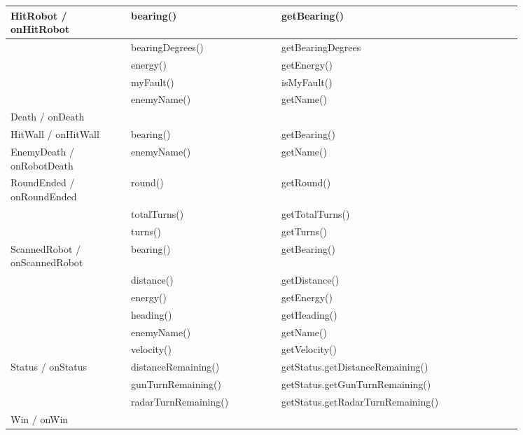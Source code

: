 \begin{center}
	\begin{tabular}{ | p{0.2\linewidth} | p{0.25\linewidth} | p{0.4\linewidth} |}
		\hline
		HitRobot / onHitRobot & bearing() & getBearing() \\ \hline
		& bearingDegrees() & getBearingDegrees \\ \hline
		& energy() & getEnergy() \\ \hline
		& myFault() & isMyFault() \\ \hline
		& enemyName() & getName() \\ \hline
		Death / onDeath & & \\ \hline
		HitWall / onHitWall & bearing() & getBearing() \\ \hline
		EnemyDeath / onRobotDeath & enemyName() & getName() \\ \hline
		RoundEnded / onRoundEnded & round() & getRound() \\ \hline
		& totalTurns() & getTotalTurns() \\ \hline
		& turns() & getTurns() \\ \hline
		ScannedRobot / onScannedRobot & bearing() & getBearing() \\ \hline
		& distance() & getDistance() \\ \hline
		& energy() & getEnergy() \\ \hline
		& heading() & getHeading() \\ \hline
		& enemyName() & getName() \\ \hline
		& velocity() & getVelocity() \\ \hline
		Status / onStatus & distanceRemaining() & getStatus.getDistanceRemaining() \\ \hline
		& gunTurnRemaining() & getStatus.getGunTurnRemaining() \\ \hline
		& radarTurnRemaining() & getStatus.getRadarTurnRemaining() \\ \hline
		Win / onWin &  & \\
		\hline
	\end{tabular}
		\label{fig:EventTable}
\end{center}
